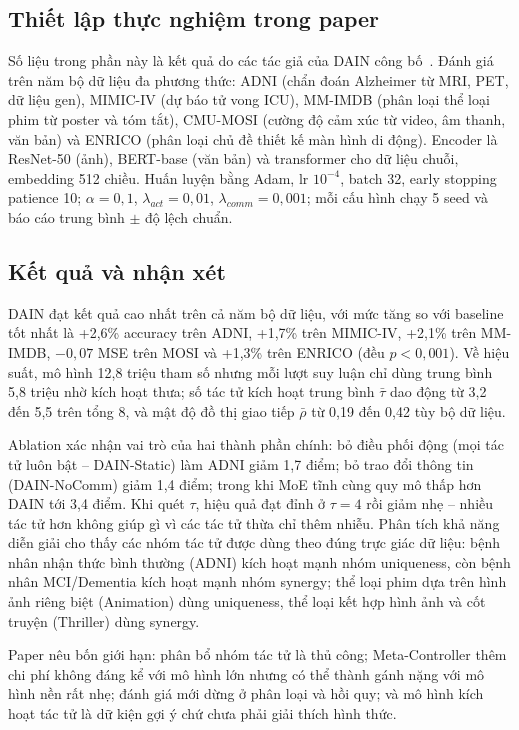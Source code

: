 \subsection{Thiết lập thực nghiệm trong paper}
Số liệu trong phần này là kết quả do các tác giả của DAIN công bố~\cite{dain2026}. Đánh giá trên năm bộ dữ liệu đa phương thức: ADNI (chẩn đoán Alzheimer từ MRI, PET, dữ liệu gen), MIMIC-IV (dự báo tử vong ICU), MM-IMDB (phân loại thể loại phim từ poster và tóm tắt), CMU-MOSI (cường độ cảm xúc từ video, âm thanh, văn bản) và ENRICO (phân loại chủ đề thiết kế màn hình di động). Encoder là ResNet-50 (ảnh), BERT-base (văn bản) và transformer cho dữ liệu chuỗi, embedding 512 chiều. Huấn luyện bằng Adam, lr $10^{-4}$, batch 32, early stopping patience 10; $\alpha = 0{,}1$, $\lambda_{act} = 0{,}01$, $\lambda_{comm} = 0{,}001$; mỗi cấu hình chạy 5 seed và báo cáo trung bình $\pm$ độ lệch chuẩn.

\subsection{Kết quả và nhận xét}
DAIN đạt kết quả cao nhất trên cả năm bộ dữ liệu, với mức tăng so với baseline tốt nhất là +2,6\% accuracy trên ADNI, +1,7\% trên MIMIC-IV, +2,1\% trên MM-IMDB, $-0{,}07$ MSE trên MOSI và +1,3\% trên ENRICO (đều $p<0{,}001$). Về hiệu suất, mô hình 12,8 triệu tham số nhưng mỗi lượt suy luận chỉ dùng trung bình 5,8 triệu nhờ kích hoạt thưa; số tác tử kích hoạt trung bình $\bar{\tau}$ dao động từ 3,2 đến 5,5 trên tổng 8, và mật độ đồ thị giao tiếp $\bar{\rho}$ từ 0,19 đến 0,42 tùy bộ dữ liệu.

Ablation xác nhận vai trò của hai thành phần chính: bỏ điều phối động (mọi tác tử luôn bật -- DAIN-Static) làm ADNI giảm 1,7 điểm; bỏ trao đổi thông tin (DAIN-NoComm) giảm 1,4 điểm; trong khi MoE tĩnh cùng quy mô thấp hơn DAIN tới 3,4 điểm. Khi quét $\tau$, hiệu quả đạt đỉnh ở $\tau = 4$ rồi giảm nhẹ -- nhiều tác tử hơn không giúp gì vì các tác tử thừa chỉ thêm nhiễu. Phân tích khả năng diễn giải cho thấy các nhóm tác tử được dùng theo đúng trực giác dữ liệu: bệnh nhân nhận thức bình thường (ADNI) kích hoạt mạnh nhóm uniqueness, còn bệnh nhân MCI/Dementia kích hoạt mạnh nhóm synergy; thể loại phim dựa trên hình ảnh riêng biệt (Animation) dùng uniqueness, thể loại kết hợp hình ảnh và cốt truyện (Thriller) dùng synergy.

Paper nêu bốn giới hạn: phân bổ nhóm tác tử là thủ công; Meta-Controller thêm chi phí không đáng kể với mô hình lớn nhưng có thể thành gánh nặng với mô hình nền rất nhẹ; đánh giá mới dừng ở phân loại và hồi quy; và mô hình kích hoạt tác tử là dữ kiện gợi ý chứ chưa phải giải thích hình thức.
